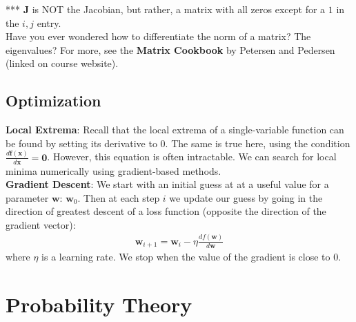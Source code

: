 \documentclass{harvardml}
\theoremstyle{definition}
\theoremstyle{plain}
\renewcommand{\v}[1]{\mathbf{#1}}
\begin{document}
             *** $\v J$ is NOT the Jacobian, but rather, a matrix with
             all zeros except for a $1$ in the $i,j$ entry.\\
    
            \noindent Have you ever wondered how to differentiate
            the norm of a matrix? The eigenvalues? 
            For more, see the \textbf{Matrix Cookbook} 
            by Petersen and Pedersen (linked on course website).\\


    \subsection{Optimization}
            \textbf{Local Extrema}: Recall that the local extrema of a 
			single-variable function can be found by setting its derivative 
			to 0. The same is true here, using the condition 
			$\frac{d \mathbf{f}(\mathbf{x})}{d \mathbf{x}}= \mathbf{0}$. 
			However, this equation is often intractable. We can search for 
            local minima numerically using gradient-based methods.\\

            \noindent \textbf{Gradient Descent}: We start with an initial 
			guess at at a useful value for a parameter $\v w$: 
			$\mathbf{w}_0$. Then at each step $i$ we update our guess 
			by going in the direction of greatest descent of a loss 
			function (opposite the direction of the gradient vector):
                  \begin{align*}
                      \mathbf{w}_{i+1} = \mathbf{w}_i - \eta 
					  \frac{d f(\mathbf{w})}{d \mathbf{w}}
                  \end{align*}
        	where $\eta$ is a learning rate. We stop when the value of 
			the gradient is close to 0. \\

    
\section{Probability Theory}
\end{document}
